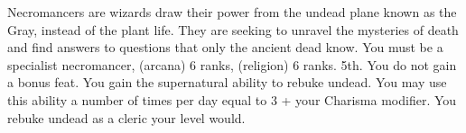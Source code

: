 {Necromancers are wizards draw their power from the undead plane known as the Gray, instead of the plant life. They are seeking to unravel the mysteries of death and find answers to questions that only the ancient dead know.}
{You must be a specialist necromancer,  (arcana) 6 ranks,  (religion) 6 ranks.}
{5th.}
{You do not gain a bonus feat.}
{
	You gain the supernatural ability to rebuke undead. You may use this ability a number of times per day equal to 3 + your Charisma modifier. You rebuke undead as a cleric your level would.
}
